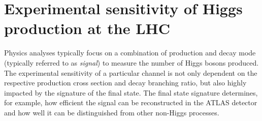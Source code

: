 \section{Experimental sensitivity of Higgs production at the LHC}
\label{subsec:exp-accessibility}



Physics analyses typically focus on a combination of production and decay mode (typically referred to as \emph{signal}) to measure the number of Higgs bosons produced. The experimental sensitivity of a particular channel is not only dependent on the respective production cross section and decay branching ratio, but also highly impacted by the signature of the final state. The final state signature determines, for example, how efficient the signal can be reconstructed in the ATLAS detector and how well it can be distinguished from other non-Higgs processes. 

